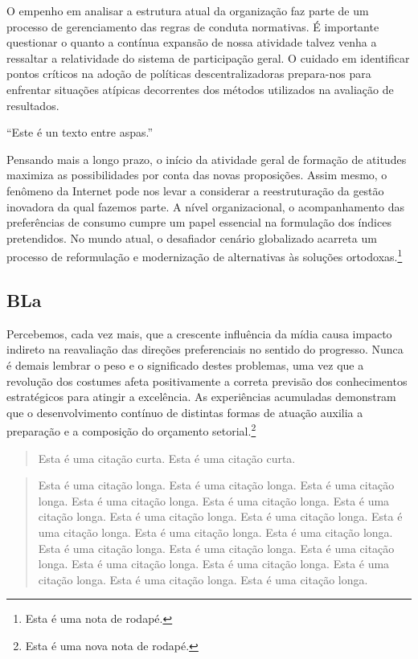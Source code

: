 \documentclass[10pt,a4paper,twoside]{article}
\begin{document}
	O empenho em analisar a estrutura atual da organização faz parte de um processo de gerenciamento das regras de conduta normativas. É importante questionar o quanto a contínua expansão de nossa atividade talvez venha a ressaltar a relatividade do sistema de participação geral. O cuidado em identificar pontos críticos na adoção de políticas descentralizadoras prepara-nos para enfrentar situações atípicas decorrentes dos métodos utilizados na avaliação de resultados.
	
	\enquote{Este é un texto entre aspas.}
	
	Pensando mais a longo prazo, o início da atividade geral de formação de atitudes maximiza as possibilidades por conta das novas proposições. Assim mesmo, o fenômeno da Internet pode nos levar a considerar a reestruturação da gestão inovadora da qual fazemos parte. A nível organizacional, o acompanhamento das preferências de consumo cumpre um papel essencial na formulação dos índices pretendidos. No mundo atual, o desafiador cenário globalizado acarreta um processo de reformulação e modernização de alternativas às soluções ortodoxas.\footnote{Esta é uma nota de rodapé.}
	
	\subsection{BLa}
	
	Percebemos, cada vez mais, que a crescente influência da mídia causa impacto indireto na reavaliação das direções preferenciais no sentido do progresso. Nunca é demais lembrar o peso e o significado destes problemas, uma vez que a revolução dos costumes afeta positivamente a correta previsão dos conhecimentos estratégicos para atingir a excelência. As experiências acumuladas demonstram que o desenvolvimento contínuo de distintas formas de atuação auxilia a preparação e a composição do orçamento setorial.\footnote{Esta é uma nova nota de rodapé.}
	
	\begin{quote}
		Esta é uma citação curta. Esta é uma citação curta.
	\end{quote}
	
	\begin{quotation}
		Esta é uma citação longa. Esta é uma citação longa. Esta é uma citação longa. Esta é uma citação longa. Esta é uma citação longa. Esta é uma citação longa. Esta é uma citação longa. Esta é uma citação longa. Esta é uma citação longa. Esta é uma citação longa. Esta é uma citação longa. Esta é uma citação longa. Esta é uma citação longa. Esta é uma citação longa. Esta é uma citação longa. Esta é uma citação longa. Esta é uma citação longa. Esta é uma citação longa. Esta é uma citação longa.
	\end{quotation}
	
\end{document}
